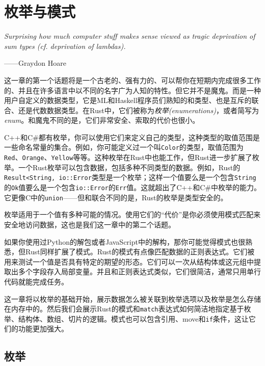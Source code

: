 \chapter{枚举与模式}\label{ch10}

\emph{Surprising how much computer stuff makes sense viewed as tragic deprivation of sum types (cf. deprivation of lambdas).}

\begin{flushright}
    ——Graydon Hoare
\end{flushright}

这一章的第一个话题将是一个古老的、强有力的、可以帮你在短期内完成很多工作的、并且在许多语言中以不同的名字广为人知的特性。但它并不是魔鬼。而是一种用户自定义的数据类型，它是ML和Haskell程序员们熟知的和类型、也是互斥的联合、还是代数数据类型。在Rust中，它们被称为\emph{枚举(enumerations)}，或者简写为\emph{enum}。和魔鬼不同的是，它们非常安全、索取的代价也很小。

C++和C\#都有枚举，你可以使用它们来定义自己的类型，这种类型的取值范围是一些命名常量的集合。例如，你可能定义过一个叫\texttt{Color}的类型，取值范围为\texttt{Red}、\texttt{Orange}、\texttt{Yellow}等等。这种枚举在Rust中也能工作，但Rust进一步扩展了枚举。一个Rust枚举可以包含数据，包括多种不同类型的数据。例如，Rust的\texttt{Result<String, io::Error}类型是一个枚举；这样一个值要么是一个包含\texttt{String}的\texttt{Ok}值要么是一个包含\texttt{io::Error}的\texttt{Err}值。这就超出了C++和C\#中枚举的能力。它更像C中的\texttt{union}——但和联合不同的是，Rust的枚举是类型安全的。

枚举适用于一个值有多种可能的情况。使用它们的“代价”是你必须使用模式匹配来安全地访问数据，这也是我们这一章中的第二个话题。

如果你使用过Python的解包或者JavaScript中的解构，那你可能觉得模式也很熟悉，但Rust同样扩展了模式。Rust的模式有点像匹配数据的正则表达式。它们被用来测试一个值是否具有特定的期望的形态。它们可以一次从结构体或这元组中提取出多个字段存入局部变量。并且和正则表达式类似，它们很简洁，通常只用单行代码就能完成任务。

这一章将以枚举的基础开始，展示数据怎么被关联到枚举选项以及枚举是怎么存储在内存中的。然后我们会展示Rust的模式和\texttt{match}表达式如何简洁地指定基于枚举、结构体、数组、切片的逻辑。模式也可以包含引用、move和\texttt{if}条件，这让它们的功能更加强大。

\section{枚举}\label{enum}

